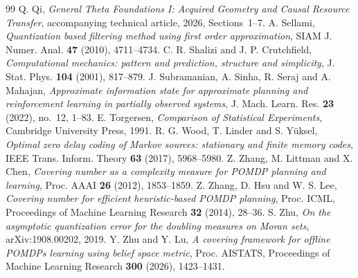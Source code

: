 \begin{thebibliography}{99}
 Q. Qi, \emph{General Theta Foundations I: Acquired Geometry and Causal Resource Transfer}, accompanying technical article, 2026, Sections~1--7.
 A. Sellami, \emph{Quantization based filtering method using first order approximation}, SIAM J. Numer. Anal. \textbf{47} (2010), 4711--4734.
 C. R. Shalizi and J. P. Crutchfield, \emph{Computational mechanics: pattern and prediction, structure and simplicity}, J. Stat. Phys. \textbf{104} (2001), 817--879.
 J. Subramanian, A. Sinha, R. Seraj and A. Mahajan, \emph{Approximate information state for approximate planning and reinforcement learning in partially observed systems}, J. Mach. Learn. Res. \textbf{23} (2022), no.~12, 1--83.
 E. Torgersen, \emph{Comparison of Statistical Experiments}, Cambridge University Press, 1991.
 R. G. Wood, T. Linder and S. Y\"uksel, \emph{Optimal zero delay coding of Markov sources: stationary and finite memory codes}, IEEE Trans. Inform. Theory \textbf{63} (2017), 5968--5980.
 Z. Zhang, M. Littman and X. Chen, \emph{Covering number as a complexity measure for POMDP planning and learning}, Proc. AAAI \textbf{26} (2012), 1853--1859.
 Z. Zhang, D. Hsu and W. S. Lee, \emph{Covering number for efficient heuristic-based POMDP planning}, Proc. ICML, Proceedings of Machine Learning Research \textbf{32} (2014), 28--36.
 S. Zhu, \emph{On the asymptotic quantization error for the doubling measures on Moran sets}, arXiv:1908.00202, 2019.
 Y. Zhu and Y. Lu, \emph{A covering framework for offline POMDPs learning using belief space metric}, Proc. AISTATS, Proceedings of Machine Learning Research \textbf{300} (2026), 1423--1431.
\end{thebibliography}
